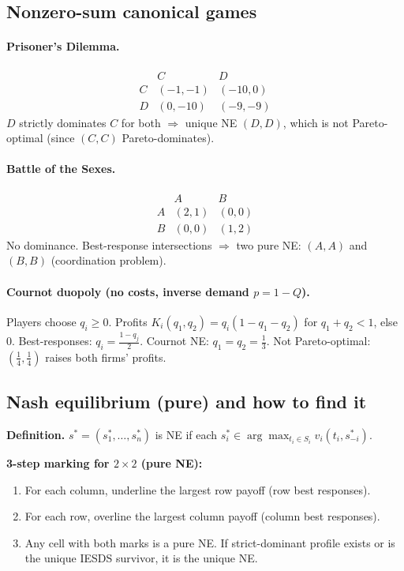 \documentclass[9pt]{article}
\begin{document}
\subsection*{Nonzero-sum canonical games}
\paragraph{Prisoner’s Dilemma.}
\[
\begin{array}{c|cc}
 & C & D\\\hline
C &(-1,-1)&(-10,0)\\
D &(0,-10)&(-9,-9)
\end{array}
\]
$D$ strictly dominates $C$ for both $\Rightarrow$ unique NE $(D,D)$, which is not Pareto-optimal (since $(C,C)$ Pareto-dominates).

\paragraph{Battle of the Sexes.}
\[
\begin{array}{c|cc}
 & A & B\\\hline
A&(2,1)&(0,0)\\
B&(0,0)&(1,2)
\end{array}
\]
No dominance. Best-response intersections $\Rightarrow$ two pure NE: $(A,A)$ and $(B,B)$ (coordination problem).

\paragraph{Cournot duopoly (no costs, inverse demand $p=1-Q$).}
Players choose $q_i\ge 0$. Profits $K_i(q_1,q_2)=q_i(1-q_1-q_2)$ for $q_1+q_2<1$, else $0$.
Best-responses: $q_i=\frac{1-q_j}{2}$. Cournot NE: $q_1=q_2=\tfrac{1}{3}$.
Not Pareto-optimal: $(\tfrac14,\tfrac14)$ raises both firms’ profits.

\subsection*{Nash equilibrium (pure) and how to find it}
\textbf{Definition.} $s^*=(s_1^*,\dots,s_n^*)$ is NE if each $s_i^*\in\arg\max_{t_i\in S_i}v_i(t_i,s_{-i}^*)$.

\textbf{3-step marking for $2\times 2$ (pure NE):}
\begin{enumerate}[label=\arabic*)]
  \item For each column, underline the largest row payoff (row best responses).
  \item For each row, overline the largest column payoff (column best responses).
  \item Any cell with both marks is a pure NE. If strict-dominant profile exists or is the unique IESDS survivor, it is the unique NE.
\end{enumerate}
\end{document}
